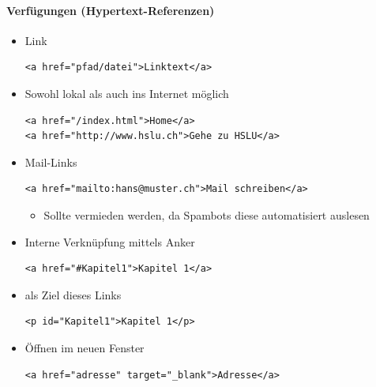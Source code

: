 \documentclass[10pt,a4paper]{article}
\begin{document}
\paragraph{Verfügungen (Hypertext-Referenzen)}
\begin{itemize}[noitemsep,topsep=0pt,leftmargin=*]
    \item Link
    \begin{lstlisting}
<a href="pfad/datei">Linktext</a>
    \end{lstlisting}
    \item Sowohl lokal als auch ins Internet möglich
    \begin{lstlisting}
<a href="/index.html">Home</a>
<a href="http://www.hslu.ch">Gehe zu HSLU</a>
    \end{lstlisting}

    \item Mail-Links
    \begin{lstlisting}
<a href="mailto:hans@muster.ch">Mail schreiben</a>
    \end{lstlisting}
    \begin{itemize}[noitemsep,topsep=0pt,leftmargin=*]
        \item Sollte vermieden werden, da Spambots diese automatisiert auslesen
    \end{itemize}
        \item Interne Verknüpfung mittels Anker
    \begin{lstlisting}
<a href="#Kapitel1">Kapitel 1</a>
    \end{lstlisting}
    \item als Ziel dieses Links
    \begin{lstlisting}
<p id="Kapitel1">Kapitel 1</p>
    \end{lstlisting}
    \item Öffnen im neuen Fenster
    \begin{lstlisting}
<a href="adresse" target="_blank">Adresse</a>
    \end{lstlisting}
\end{itemize}
\end{document}
